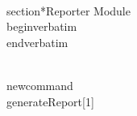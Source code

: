 \\section*{Reporter Module}
\\begin{verbatim}
% Reporter Module for TeX Data Processing
% This module generates a report from the transformed data.
% The report includes:
% 1. Summary statistics.
% 2. Data tables.
% 3. Error summaries.
\\end{verbatim}

\\newcommand{\\generateReport}[1]{
}
